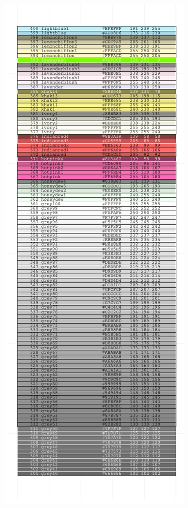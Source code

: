 \documentclass[letterpaper]{article}
\begin{document}
\begin{center}
\begin{figure}[ht]
\begin{minipage}[b]{0.5\linewidth}
\includegraphics{ggplotCheatSheet-008}
\end{minipage}
\end{figure}


\end{center}
\end{document}
